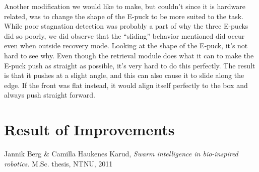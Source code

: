 \documentclass[a4paper,12pt]{article}
\begin{document}
Another modification we would like to make, but couldn't since it is hardware related, was to change the shape of the E-puck to be more suited to the task. While poor stagnation detection was probably a part of why the three E-pucks did so poorly, we did observe that the ``sliding'' behavior mentioned did occur even when outside recovery mode. Looking at the shape of the E-puck, it's not hard to see why. Even though the retrieval module does what it can to make the E-puck push as straight as possible, it's very hard to do this perfectly. The result is that it pushes at a slight angle, and this can also cause it to slide along the edge. If the front was flat instead, it would align itself perfectly to the box and always push straight forward.

\section{Result of Improvements}


\begin{thebibliography}{9}

  Jannik Berg \& Camilla Haukenes Karud,
  \emph{Swarm intelligence in bio-inspired
robotics}.
  M.Sc. thesis,
  NTNU,
  2011

\end{thebibliography}
\end{document}
